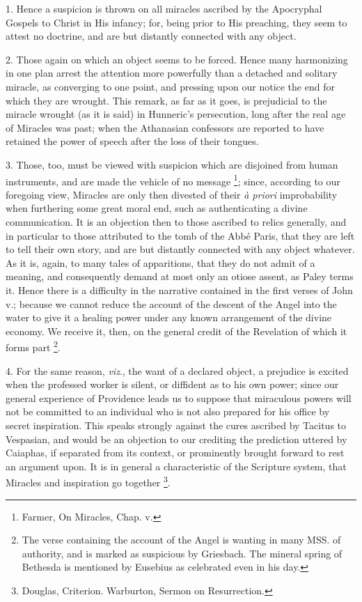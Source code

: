 
1. Hence a suspicion is thrown on all miracles
ascribed by the Apocryphal Gospels to Christ in His infancy; for,
being prior to His preaching, they seem to attest no doctrine,
and are but distantly connected with any object.

2. Those again on which an object seems to be
forced. Hence many harmonizing in one plan arrest the attention more
powerfully than a detached and solitary miracle, as converging to one
point, and pressing upon our notice the end for which they are
wrought. This remark, as far as it goes, is prejudicial to the miracle
wrought (as it is said) in Hunneric's persecution, long after the
real age of Miracles was past; when the Athanasian confessors are
reported to have retained the power of speech after the loss of their
tongues.

3. Those, too, must be viewed with suspicion
which are disjoined from human instruments, and are made the vehicle
of no message \footnote{Farmer, On Miracles, Chap. v.}; since, according to our foregoing view,
Miracles are only then divested of their \emph{à priori}
improbability when furthering some great moral end, such as
authenticating a divine communication. It is an objection then to
those ascribed to relics generally, and in particular to those
attributed to the tomb of the Abbé Paris, that they are left to tell
their own story, and are but distantly connected with any object
whatever. As it is, again, to many tales of apparitions, that they do
not admit of a meaning, and consequently demand at most only an otiose
assent, as Paley terms it. Hence there is a difficulty in the
narrative contained in the first verses of John v.; because we cannot
reduce the account of the descent of the Angel into the water to give
it a healing power under any known arrangement of the divine economy.
We receive it, then, on the general credit of the Revelation of which
it forms part \footnote{The verse containing the account of the Angel
is wanting in many MSS. of authority, and is marked as suspicious by
Griesbach. The mineral spring of Bethesda is mentioned by Eusebius as
celebrated even in his day.}.

4. For the same reason, \emph{viz}., the want of a
declared object, a prejudice is excited when the professed worker is
silent, or diffident as to his own power; since our general experience
of Providence leads us to suppose that miraculous powers will not be
committed to an individual who is not also prepared for his office by
secret inspiration. This speaks strongly against the cures ascribed by
Tacitus to Vespasian, and would be an objection to our crediting the
prediction uttered by Caiaphas, if separated from its context, or
prominently brought forward to rest an argument upon. It is in general
a characteristic of the Scripture system, that Miracles and
inspiration go together \footnote{Douglas, Criterion. Warburton, Sermon on
Resurrection.}.

